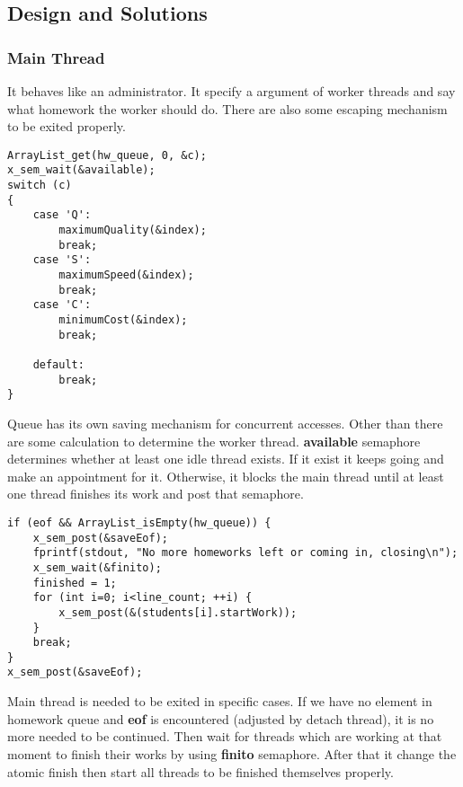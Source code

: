 \documentclass{article}
\begin{document}
\subsection{Design and Solutions}
\subsubsection{Main Thread}
It behaves like an administrator. It specify a argument of worker threads and say what homework the worker should do. There are also some escaping mechanism to be exited properly.
\begin{lstlisting}[style=CStyle]
ArrayList_get(hw_queue, 0, &c);    
x_sem_wait(&available);
switch (c)
{
    case 'Q':
        maximumQuality(&index);
        break;
    case 'S':
        maximumSpeed(&index);
        break;
    case 'C':
        minimumCost(&index);
        break;
    
    default:
        break;
}
\end{lstlisting}
Queue has its own saving mechanism for concurrent accesses. Other than there are some calculation to determine the worker thread. \textbf{available} semaphore determines whether at least one idle thread exists. If it exist it keeps going and make an appointment for it. Otherwise, it blocks the main thread until at least one thread finishes its work and post that semaphore.
\\
\begin{lstlisting}[style=CStyle]
if (eof && ArrayList_isEmpty(hw_queue)) {
    x_sem_post(&saveEof);
    fprintf(stdout, "No more homeworks left or coming in, closing\n");
    x_sem_wait(&finito);
    finished = 1;
    for (int i=0; i<line_count; ++i) {
        x_sem_post(&(students[i].startWork));
    }
    break;
}
x_sem_post(&saveEof);
\end{lstlisting}
Main thread is needed to be exited in specific cases. If we have no element in homework queue and \textbf{eof} is encountered (adjusted by detach thread), it is no more needed to be continued. Then wait for threads which are working at that moment to finish their works by using \textbf{finito} semaphore. After that it change the atomic finish then start all threads to be finished themselves properly.
\newpage
\end{document}
